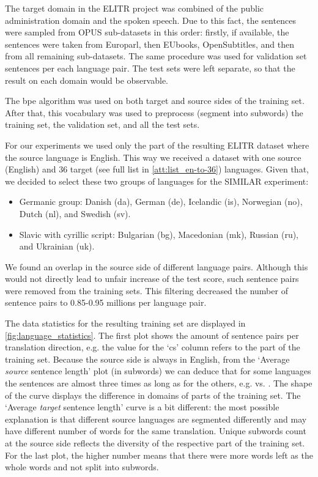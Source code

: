 The target domain in the ELITR project was combined of the public administration
domain and the spoken speech.
Due to this fact, the sentences were sampled from OPUS sub-datasets in this order:
firstly, if available, the sentences were taken from Europarl,
then EUbooks, OpenSubtitles, and then from all remaining sub-datasets.
The same procedure was used for validation set sentences per each language pair.
The test sets were left separate, so that the result on each domain would be observable.

The \acrshort{bpe} algorithm was used on both target and source sides of the
training set. After that, this vocabulary was used to preprocess (segment into subwords)
the training set, the validation set, and all the test sets.

For our experiments we used only the part of the resulting ELITR dataset where
the source language is English.
This way we received a dataset with one source (English) and 36 target 
(see full list in \cref{att:list_en-to-36}) languages.
Given that,
we decided to select these two groups of languages for the SIMILAR experiment:
\begin{itemize}
	\item Germanic group: Danish (da), German (de), Icelandic (is),
	Norwegian (no), Dutch (nl), and Swedish (sv).
	\item Slavic with cyrillic script: Bulgarian (bg), Macedonian (mk),
	Russian (ru), and Ukrainian (uk).
\end{itemize}



We found an overlap in the source side of different language pairs.
Although this would not directly lead to unfair increase of the test score,
such sentence pairs were removed from the training sets.
This filtering decreased the number of sentence pairs
to 0.85-0.95 millions per language pair.

The data statistics for the resulting training set are displayed in \cref{fig:language_statistics}.
The first plot shows the amount of sentence pairs per translation direction, e.g.
the value for the `cs' column refers to the  part of the training set.
Because the source side is always in English, from the `Average \emph{source} sentence length'
plot (in subwords) we can deduce that for some languages the sentences are almost three times
as long as for the others, e.g.  vs. .
The shape of the curve displays the difference in domains of parts of the training set.
The `Average \emph{target} sentence length' curve is a bit different: the most possible
explanation is that different source languages are segmented differently and may have
different number of words for the same translation.
Unique subwords count at the source side reflects the diversity of the respective part
of the training set.
For the last plot, the higher number means that there were more words left as the whole
words and not split into subwords.

